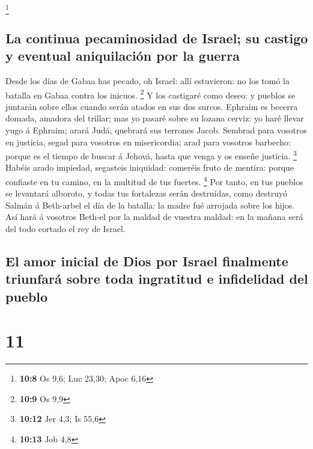 \footnote{\textbf{10:8} Os 9,6; Luc 23,30; Apoc 6,16}

\hypertarget{la-continua-pecaminosidad-de-israel-su-castigo-y-eventual-aniquilaciuxf3n-por-la-guerra}{%
\subsection{La continua pecaminosidad de Israel; su castigo y eventual
aniquilación por la
guerra}\label{la-continua-pecaminosidad-de-israel-su-castigo-y-eventual-aniquilaciuxf3n-por-la-guerra}}

 Desde los días de Gabaa has pecado, oh Israel: allí
estuvieron: no los tomó la batalla en Gabaa contra los inicuos.
\footnote{\textbf{10:9} Os 9,9}  Y los castigaré como
deseo: y pueblos se juntarán sobre ellos cuando serán atados en sus dos
surcos.  Ephraim es becerra domada, amadora del trillar;
mas yo pasaré sobre su lozana cerviz: yo haré llevar yugo á Ephraim;
arará Judá, quebrará sus terrones Jacob.  Sembrad para
vosotros en justicia, segad para vosotros en misericordia; arad para
vosotros barbecho: porque es el tiempo de buscar á Jehová, hasta que
venga y os enseñe justicia. \footnote{\textbf{10:12} Jer 4,3; Is 55,6}
 Habéis arado impiedad, segasteis iniquidad: comeréis fruto
de mentira: porque confiaste en tu camino, en la multitud de tus
fuertes. \footnote{\textbf{10:13} Job 4,8}  Por tanto, en
tus pueblos se levantará alboroto, y todas tus fortalezas serán
destruídas, como destruyó Salmán á Beth-arbel el día de la batalla: la
madre fué arrojada sobre los hijos.  Así hará á vosotros
Beth-el por la maldad de vuestra maldad: en la mañana será del todo
cortado el rey de Israel.

\hypertarget{el-amor-inicial-de-dios-por-israel-finalmente-triunfaruxe1-sobre-toda-ingratitud-e-infidelidad-del-pueblo}{%
\subsection{El amor inicial de Dios por Israel finalmente triunfará
sobre toda ingratitud e infidelidad del
pueblo}\label{el-amor-inicial-de-dios-por-israel-finalmente-triunfaruxe1-sobre-toda-ingratitud-e-infidelidad-del-pueblo}}

\hypertarget{section-10}{%
\section{11}\label{section-10}}

